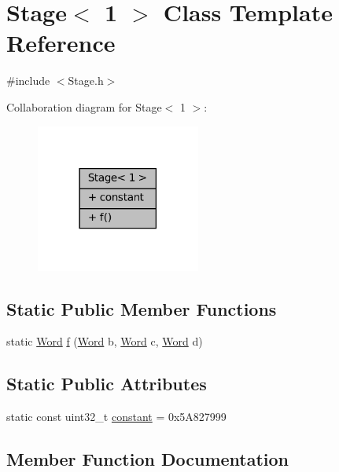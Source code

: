 \hypertarget{class_stage_3_011_01_4}{}\section{Stage$<$ 1 $>$ Class Template Reference}
\label{class_stage_3_011_01_4}


{\ttfamily \#include $<$Stage.\+h$>$}



Collaboration diagram for Stage$<$ 1 $>$\+:
\nopagebreak
\begin{figure}[H]
\begin{center}
\leavevmode
\includegraphics[width=153pt]{class_stage_3_011_01_4__coll__graph}
\end{center}
\end{figure}
\subsection*{Static Public Member Functions}
\begin{DoxyCompactItemize}
\item 
static \mbox{\hyperlink{class_word}{Word}} \mbox{\hyperlink{class_stage_3_011_01_4_a085bc3390c917e2c196bf05f5276cae9}{f}} (\mbox{\hyperlink{class_word}{Word}} b, \mbox{\hyperlink{class_word}{Word}} c, \mbox{\hyperlink{class_word}{Word}} d)
\end{DoxyCompactItemize}
\subsection*{Static Public Attributes}
\begin{DoxyCompactItemize}
\item 
static const uint32\+\_\+t \mbox{\hyperlink{class_stage_3_011_01_4_a5b98ce9d68980826e71d133475bc3f1c}{constant}} = 0x5\+A827999
\end{DoxyCompactItemize}


\subsection{Member Function Documentation}
\mbox{\label{class_stage_3_011_01_4_a085bc3390c917e2c196bf05f5276cae9}} 
